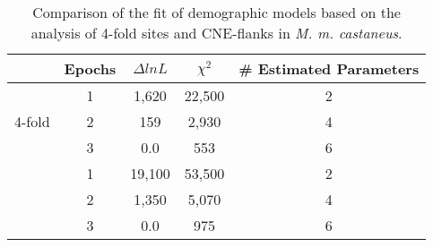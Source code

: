 \begin{table}[h!]
\centering
\caption[Comparison of the fit of demographic models based on the analysis of 4-fold sites and CNE-flanks in \textit{M. m. castaneus}]{Comparison of the fit of demographic models based on the analysis of 4-fold sites and CNE-flanks in \textit{M. m. castaneus}.}
 \begin{tabular}{c c c c c } 

\toprule
       &Epochs&$\Delta lnL$& $\chi^2$& \# Estimated Parameters \\ \hline
\multirow{3}{*}{4-fold} & 	1 &	1,620	 &	22,500 	&	2 \\
		 &	2 &	159		 &	2,930 	&	4 \\
 		&	3 &	0.0		 &	553 		&	6 \\ \hdashline
\multirow{3}{*}{CNE-flank} &	1 &	19,100	 &	53,500 	&	2 \\
		 &	2 &	1,350	 &	5,070	&	4 \\
 		&	3 &	0.0 		 &	975 		&	6 \\
\bottomrule
\end{tabular}
\label{tab:CS1}
\end{table}
